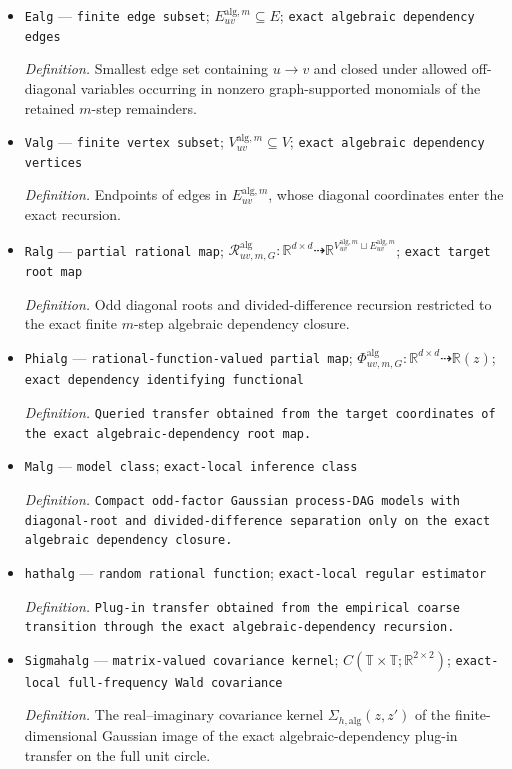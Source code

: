 \documentclass{article}
\begin{document}
\begin{itemize}
  \item \texttt{Ealg} --- \texttt{finite edge subset}; \(E_{uv}^{\mathrm{alg},m}\subseteq E\); \texttt{exact algebraic dependency edges}
  \par\smallskip\noindent\emph{Definition.} Smallest edge set containing \(u\to v\) and closed under allowed off-diagonal variables occurring in nonzero graph-supported monomials of the retained \(m\)-step remainders.
  \item \texttt{Valg} --- \texttt{finite vertex subset}; \(V_{uv}^{\mathrm{alg},m}\subseteq V\); \texttt{exact algebraic dependency vertices}
  \par\smallskip\noindent\emph{Definition.} Endpoints of edges in \(E_{uv}^{\mathrm{alg},m}\), whose diagonal coordinates enter the exact recursion.
  \item \texttt{Ralg} --- \texttt{partial rational map}; \(\mathscr R^{\mathrm{alg}}_{uv,m,G}:\mathbb R^{d\times d}\dashrightarrow\mathbb R^{V_{uv}^{\mathrm{alg},m}\sqcup E_{uv}^{\mathrm{alg},m}}\); \texttt{exact target root map}
  \par\smallskip\noindent\emph{Definition.} Odd diagonal roots and divided-difference recursion restricted to the exact finite \(m\)-step algebraic dependency closure.
  \item \texttt{Phialg} --- \texttt{rational-\allowbreak{}function-\allowbreak{}valued partial map}; \(\Phi^{\mathrm{alg}}_{uv,m,G}:\mathbb R^{d\times d}\dashrightarrow\mathbb R(z)\); \texttt{exact dependency identifying functional}
  \par\smallskip\noindent\emph{Definition.} \texttt{Queried transfer obtained from the target coordinates of the exact algebraic-\allowbreak{}dependency root map.}
  \item \texttt{Malg} --- \texttt{model class}; \texttt{exact-\allowbreak{}local inference class}
  \par\smallskip\noindent\emph{Definition.} \texttt{Compact odd-\allowbreak{}factor Gaussian process-\allowbreak{}DAG models with diagonal-\allowbreak{}root and divided-\allowbreak{}difference separation only on the exact algebraic dependency closure.}
  \item \texttt{hathalg} --- \texttt{random rational function}; \texttt{exact-\allowbreak{}local regular estimator}
  \par\smallskip\noindent\emph{Definition.} \texttt{Plug-\allowbreak{}in transfer obtained from the empirical coarse transition through the exact algebraic-\allowbreak{}dependency recursion.}
  \item \texttt{Sigmahalg} --- \texttt{matrix-\allowbreak{}valued covariance kernel}; \(C(\mathbb T\times\mathbb T;\mathbb R^{2\times2})\); \texttt{exact-\allowbreak{}local full-\allowbreak{}frequency Wald covariance}
  \par\smallskip\noindent\emph{Definition.} The real--imaginary covariance kernel \(\Sigma_{h,\mathrm{alg}}(z,z')\) of the finite-dimensional Gaussian image of the exact algebraic-dependency plug-in transfer on the full unit circle.
\end{itemize}
\end{document}
